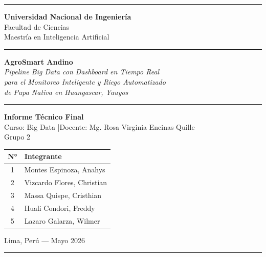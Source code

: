 \documentclass[12pt,a4paper]{article}
\begin{document}
\begin{titlepage}
    \centering
    \vspace*{1cm}

    {\color{agroverde}\rule{\textwidth}{2pt}}
    \vspace{0.5cm}

    {\Large\textbf{Universidad Nacional de Ingeniería}\\[0.3cm]
    \large Facultad de Ciencias\\[0.1cm]
    \normalsize Maestría en Inteligencia Artificial}

    \vspace{0.8cm}
    {\color{agroverde}\rule{\textwidth}{0.4pt}}
    \vspace{1.2cm}

    {\Huge\bfseries\color{agroverde} AgroSmart Andino}\\[0.5cm]
    {\Large\textit{Pipeline Big Data con Dashboard en Tiempo Real\\
    para el Monitoreo Inteligente y Riego Automatizado\\
    de Papa Nativa en Huangascar, Yauyos}}

    \vspace{1.2cm}
    {\color{agroverde}\rule{0.6\textwidth}{0.4pt}}
    \vspace{0.8cm}

    {\large\textbf{Informe Técnico Final}}\\[0.3cm]
    {\normalsize Curso: Big Data \quad|\quad Docente: Mg. Rosa Virginia Encinas Quille}\\[0.2cm]
    {\normalsize Grupo 2}

    \vspace{1cm}
    \begin{tabular}{cl}
        \toprule
        \textbf{N°} & \textbf{Integrante} \\
        \midrule
        1 & Montes Espinoza, Anahys \\
        2 & Vizcardo Flores, Christian \\
        3 & Massa Quispe, Cristhian \\
        4 & Huali Condori, Freddy \\
        5 & Lazaro Galarza, Wilmer \\
        \bottomrule
    \end{tabular}

    \vfill
    {\normalsize Lima, Perú \quad — \quad Mayo 2026}\\[0.3cm]
    {\color{agroverde}\rule{\textwidth}{2pt}}
\end{titlepage}
\end{document}
